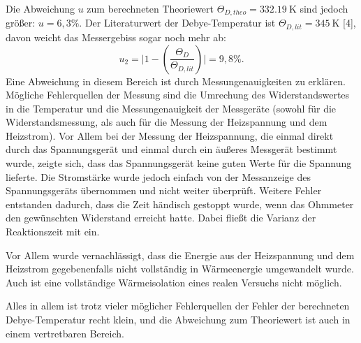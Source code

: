 Die Abweichung $u$ zum berechneten Theoriewert $\Theta_{\si{D,theo}} = \SI{332,19}{\kelvin}$ sind jedoch 
größer: $u = 6,3 \%$. Der Literaturwert der Debye-Temperatur ist $\Theta_{\si{D,lit}} = \SI{345}{\kelvin}$ [4], 
davon weicht das Messergebiss sogar noch mehr ab:
\begin{equation*}
    u_2 = \biggl| 1-\left(\frac{\Theta_{\si{D}}}{\Theta_{\si{D,lit}}}\right) \biggr| = 9,8\%.
\end{equation*}
Eine Abweichung in diesem Bereich ist durch Messungenauigkeiten zu erklären. 
Mögliche Fehlerquellen der Messung sind die Umrechung des Widerstandswertes in die Temperatur und die 
Messungenauigkeit der Messgeräte (sowohl für die Widerstandsmessung, als auch für die Messung der 
Heizspannung und dem Heizstrom). Vor Allem bei der Messung der Heizspannung, die einmal direkt durch 
das Spannungsgerät und einmal durch ein äußeres Messgerät bestimmt wurde, zeigte sich, dass das 
Spannungsgerät keine guten 
Werte für die Spannung lieferte. Die Stromstärke wurde jedoch einfach von der Messanzeige des Spannungsgeräts 
übernommen und nicht weiter überprüft. Weitere Fehler entstanden dadurch, dass die Zeit händisch gestoppt 
wurde, wenn das Ohmmeter den gewünschten Widerstand erreicht hatte. Dabei fließt die Varianz der Reaktionszeit 
mit ein. 

Vor Allem wurde vernachlässigt, dass die Energie aus der Heizspannung und dem Heizstrom gegebenenfalls 
nicht vollständig in Wärmeenergie umgewandelt wurde. Auch ist eine vollständige Wärmeisolation 
eines realen Versuchs nicht möglich. 

Alles in allem ist trotz vieler möglicher Fehlerquellen der Fehler der berechneten Debye-Temperatur recht klein, 
und die Abweichung zum Theoriewert ist auch in einem vertretbaren Bereich. 

